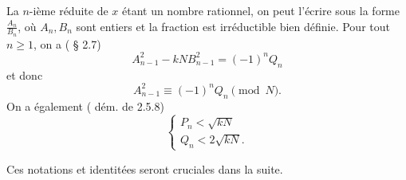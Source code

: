 La $n$-ième réduite de $x$ étant un nombre rationnel, on peut l'écrire sous la
forme $\frac{A_n}{B_n}$, où $A_n, B_n$ sont entiers et la fraction est
irréductible bien définie. Pour tout $n\geqslant 1$, on a (\cite{Lauritzen} §
2.7) \[A_{n-1}^2 - kN B_{n-1}^2 = (-1)^n Q_n\] et donc
\begin{equation}
	A_{n-1}^2 \equiv (-1)^n Q_n \pmod{N}.
\end{equation}
On a également (\cite{Lauritzen} dém. de 2.5.8)
\begin{equation}\label{inegalite}
	\begin{cases}
		P_n < \sqrt{kN} \\
		Q_n < 2\sqrt{kN}.
	\end{cases}
\end{equation}

Ces notations et identitées seront cruciales dans la suite.
